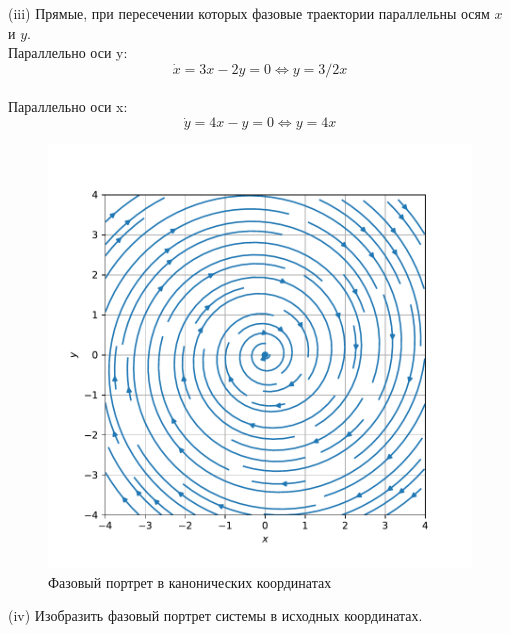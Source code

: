 \documentclass[a4paper, 12pt]{article}
\begin{document}
(iii) Прямые, при пересечении которых фазовые траектории параллельны осям $x$ и $y$.\\
Параллельно оси y:
\[\dot{x} = 3x-2y=0\Leftrightarrow y = 3/2x\]\\
Параллельно оси x:
\[\dot{y} = 4x-y=0\Leftrightarrow y = 4x\]
\begin{figure}[H]
	\centering
	\includegraphics[scale=0.8]{2a1_0}
	\caption{Фазовый портрет в канонических координатах}
	\label{im:1a1_0}
\end{figure}



(iv) Изобразить фазовый портрет системы в исходных координатах.
\end{document}
